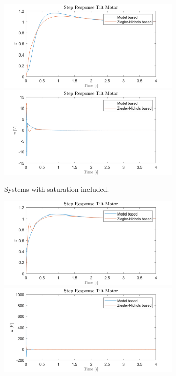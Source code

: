 \documentclass[../../main.tex]{subfiles}
\begin{document}
\begin{figure}[h]
\begin{subfigure}{0.48\textwidth}
    \includegraphics[width = 0.97\textwidth]{Sections/System_Design/Images/cascade_step_y_sat.png}
    \includegraphics[width = 0.97\textwidth]{Sections/System_Design/Images/cascade_step_u_sat.png}
    \caption{Systems with saturation included.}
    \label{fig:cascade_step_PP}
\end{subfigure}\quad
\begin{subfigure}{0.48\textwidth}
    \includegraphics[width = 0.97\textwidth]{Sections/System_Design/Images/cascade_step_y_NoSat.png}
    \includegraphics[width = 0.97\textwidth]{Sections/System_Design/Images/cascade_step_u_NoSat.png}

\end{subfigure}
\end{figure}
\end{document}
